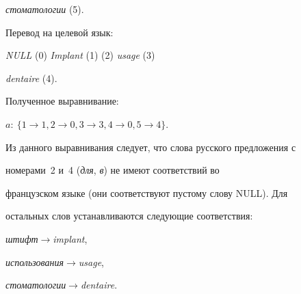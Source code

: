 \textit{стоматологии} (5).





     Перевод на целевой язык:





     \textit{NULL} (0) \textit{Implant} (1) {} (2) \textit{usage} (3)


\textit{dentaire} (4).





     Полученное выравнивание:





     $a:\ \{ 1 \to 1, 2 \to 0, 3 \to 3, 4 \to 0, 5 \to 4\}.$





     Из данного выравнивания следует, что слова русского предложения с


номерами~2 и~4 (\textit{для}, \textit{в}) не имеют соответствий во


французском языке (они соответствуют пустому слову NULL). Для


остальных слов устанавливаются следующие соответствия:


\textit{штифт}\;$\to$\;\textit{implant},


\textit{использования}\;$\to$\;\textit{usage},


\textit{стоматологии}\;$\to$\;\textit{dentaire}.





\pagebreak





\





\vspace*{-12pt}
















